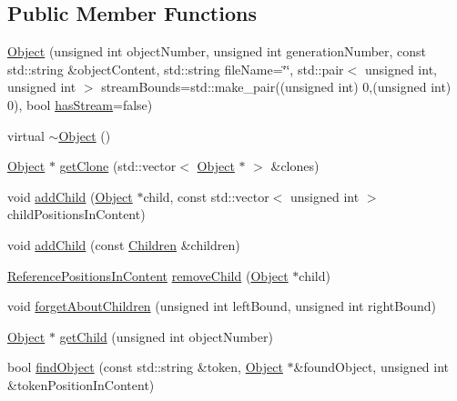 \subsection*{Public Member Functions}
\begin{DoxyCompactItemize}
\item 
\hyperlink{classmerge__lib_1_1_object_aee26acdabcb6e697a478b7aea963c91e}{Object} (unsigned int object\-Number, unsigned int generation\-Number, const std\-::string \&object\-Content, std\-::string file\-Name=\char`\"{}\char`\"{}, std\-::pair$<$ unsigned int, unsigned int $>$ stream\-Bounds=std\-::make\-\_\-pair((unsigned int) 0,(unsigned int) 0), bool \hyperlink{classmerge__lib_1_1_object_a42a15267894aa3119b5eb5e389c705fa}{has\-Stream}=false)
\item 
virtual \hyperlink{classmerge__lib_1_1_object_ae8f5483f459e46687bd01e6f9977afd3}{$\sim$\-Object} ()
\item 
\hyperlink{classmerge__lib_1_1_object}{Object} $\ast$ \hyperlink{classmerge__lib_1_1_object_ae2b09666b49e415642bd168fa5d76ba2}{get\-Clone} (std\-::vector$<$ \hyperlink{classmerge__lib_1_1_object}{Object} $\ast$ $>$ \&clones)
\item 
void \hyperlink{classmerge__lib_1_1_object_a49aeda4d58d8fa8541e9bc2c609ba5f0}{add\-Child} (\hyperlink{classmerge__lib_1_1_object}{Object} $\ast$child, const std\-::vector$<$ unsigned int $>$ child\-Positions\-In\-Content)
\item 
void \hyperlink{classmerge__lib_1_1_object_ac948a88555c813cedca3238b644956ec}{add\-Child} (const \hyperlink{classmerge__lib_1_1_object_a4e1f3bf43d9fc39fea3829f7ae1da4a8}{Children} \&children)
\item 
\hyperlink{classmerge__lib_1_1_object_aa3326883ea53ef2e2a33e2b81a7cc98c}{Reference\-Positions\-In\-Content} \hyperlink{classmerge__lib_1_1_object_a5413e83ed98fbab3a852efac0a1d783f}{remove\-Child} (\hyperlink{classmerge__lib_1_1_object}{Object} $\ast$child)
\item 
void \hyperlink{classmerge__lib_1_1_object_ad8bd931350556b884d67c7c470a61e99}{forget\-About\-Children} (unsigned int left\-Bound, unsigned int right\-Bound)
\item 
\hyperlink{classmerge__lib_1_1_object}{Object} $\ast$ \hyperlink{classmerge__lib_1_1_object_a224f409e2c575b6688db5585bab59ca5}{get\-Child} (unsigned int object\-Number)
\item 
bool \hyperlink{classmerge__lib_1_1_object_a23bc60e234d95166f9daa4eb0c2235ad}{find\-Object} (const std\-::string \&token, \hyperlink{classmerge__lib_1_1_object}{Object} $\ast$\&found\-Object, unsigned int \&token\-Position\-In\-Content)

\end{DoxyCompactItemize}
